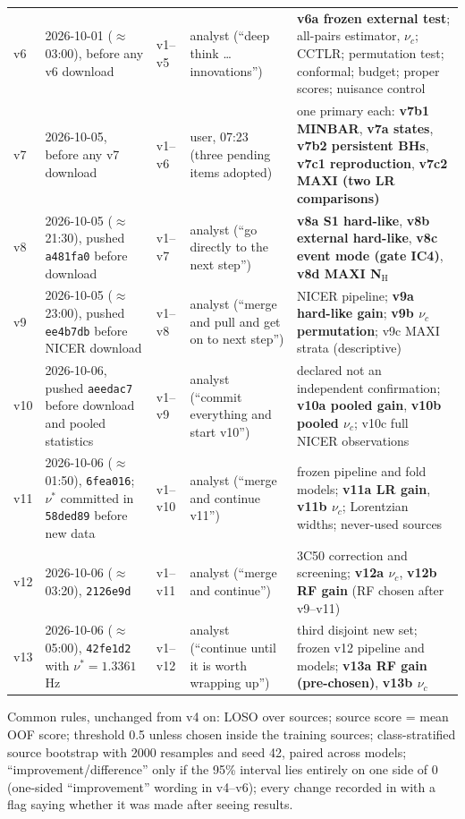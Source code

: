 {\begin{longtable}{@{}p{0.8cm}p{2.5cm}p{1.6cm}>{\raggedright\arraybackslash}p{3.0cm}>{\raggedright\arraybackslash}p{6.0cm}@{}}
v6 & 2026-10-01 ($\approx$03:00), before any v6 download & v1--v5 & analyst (``deep think \dots innovations'') & \textbf{v6a frozen external test}; all-pairs estimator, $\nu_c$; CCTLR; permutation test; conformal; budget; proper scores; nuisance control \\
v7 & 2026-10-05, before any v7 download & v1--v6 & user, 07:23 (three pending items adopted) & one primary each: \textbf{v7b1 MINBAR}, \textbf{v7a states}, \textbf{v7b2 persistent BHs}, \textbf{v7c1 reproduction}, \textbf{v7c2 MAXI (two LR comparisons)} \\
v8 & 2026-10-05 ($\approx$21:30), pushed \texttt{a481fa0} before download & v1--v7 & analyst (``go directly to the next step'') & \textbf{v8a S1 hard-like}, \textbf{v8b external hard-like}, \textbf{v8c event mode (gate IC4)}, \textbf{v8d MAXI N$_\mathrm{H}$} \\
v9 & 2026-10-05 ($\approx$23:00), pushed \texttt{ee4b7db} before NICER download & v1--v8 & analyst (``merge and pull and get on to next step'') & NICER pipeline; \textbf{v9a hard-like gain}; \textbf{v9b $\nu_c$ permutation}; v9c MAXI strata (descriptive) \\
v10 & 2026-10-06, pushed \texttt{aeedac7} before download and pooled statistics & v1--v9 & analyst (``commit everything and start v10'') & declared not an independent confirmation; \textbf{v10a pooled gain}, \textbf{v10b pooled $\nu_c$}; v10c full NICER observations \\
v11 & 2026-10-06 ($\approx$01:50), \texttt{6fea016}; $\nu^*$ committed in \texttt{58ded89} before new data & v1--v10 & analyst (``merge and continue v11'') & frozen pipeline and fold models; \textbf{v11a LR gain}, \textbf{v11b $\nu_c$}; Lorentzian widths; never-used sources \\
v12 & 2026-10-06 ($\approx$03:20), \texttt{2126e9d} & v1--v11 & analyst (``merge and continue'') & 3C50 correction and screening; \textbf{v12a $\nu_c$}, \textbf{v12b RF gain} (RF chosen after v9--v11) \\
v13 & 2026-10-06 ($\approx$05:00), \texttt{42fe1d2} with $\nu^*=1.3361$\,Hz & v1--v12 & analyst (``continue until it is worth wrapping up'') & third disjoint new set; frozen v12 pipeline and models; \textbf{v13a RF gain (pre-chosen)}, \textbf{v13b $\nu_c$} \\
\end{longtable}}

Common rules, unchanged from v4 on: LOSO over sources; source score = mean OOF score; threshold 0.5 unless chosen inside the training
sources; class-stratified source bootstrap with 2000 resamples and seed 42, paired across models; ``improvement/difference'' only if the 95\%
interval lies entirely on one side of 0 (one-sided ``improvement'' wording in v4--v6); every change recorded in
 with a flag saying whether it was made after seeing results.
